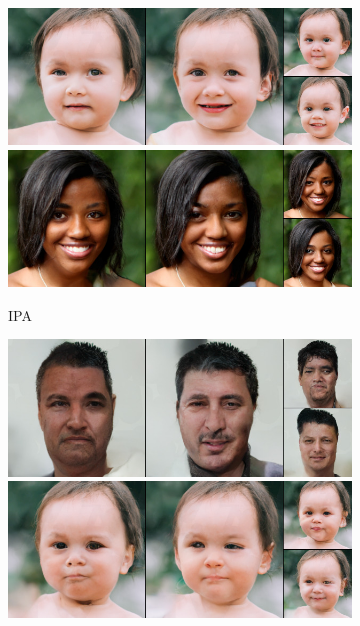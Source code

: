 \begin{figure}[t]
\begin{subfigure}[t]{0.25\textwidth}
      \includegraphics[height=\ffhqimgheight]{figs/cigcvae/image-samples/ffhq256/freeform_aipo_13_samples.jpg}
      \includegraphics[height=\ffhqimgheight]{figs/cigcvae/image-samples/ffhq256/freeform_aipo_32_samples.jpg}
      \caption{\scriptsize IPA}
    \end{subfigure}
    \begin{subfigure}[t]{0.25\textwidth}
      \centering
      \includegraphics[height=\ffhqimgheight]{figs/cigcvae/image-samples/ffhq256/freeform_aipo-r_0_samples.jpg}
      \includegraphics[height=\ffhqimgheight]{figs/cigcvae/image-samples/ffhq256/freeform_aipo-r_13_samples.jpg}

\end{subfigure}
\end{figure}
